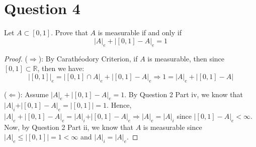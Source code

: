\section{Question 4}

\begin{question}
    Let $A \subset[0,1]$. Prove that $A$ is measurable if and only if
    $$
    |A|_e+|[0,1]-A|_e=1
    $$
\end{question}

\begin{answer}
    \begin{proof}
        ($\Rightarrow$): By Carathéodory Criterion, if $A$ is measurable, then since $[0,1] \subset \mathbb{R}$, then we have:
        \begin{equation}
            \lvert [0,1] \rvert_e = \lvert [0,1]\cap A \rvert_e + \lvert [0,1] - A \rvert_e \Rightarrow 1 = \lvert A \rvert_e + \lvert [0,1] - A\rvert
        \end{equation}
        
        ($\Leftarrow$): Assume $\lvert A \rvert_e + \lvert [0,1] - A \rvert_e = 1$. By Question 2 Part iv, we know that $\lvert A \rvert_i + \rvert [0,1] - A \rvert_e = \lvert [0,1] \rvert = 1$. Hence, $\lvert A \rvert_e + \lvert [0,1] - A \rvert_e = \lvert A \rvert_i + \rvert [0,1] - A \rvert_e \Rightarrow \lvert A \rvert_e = \lvert A \rvert_i$ since $\lvert [0,1] - A \rvert_e < \infty$. Now, by Question 2 Part ii, we know that $A$ is measurable since $\lvert A \rvert_e \leq \lvert [0,1] \rvert = 1 < \infty$ and $\lvert A \rvert_i = \lvert A \rvert_e$.
    \end{proof}
\end{answer}

